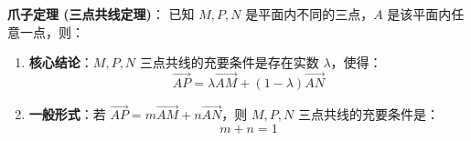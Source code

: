 \begin{statementbox}
\textbf{爪子定理 (三点共线定理)}：
已知 $M, P, N$ 是平面内不同的三点，$A$ 是该平面内任意一点，则：
\begin{enumerate}
    \item \textbf{核心结论}：$M, P, N$ 三点共线的充要条件是存在实数 $\lambda$，使得：
    \[ \vec{AP} = \lambda \vec{AM} + (1 - \lambda) \vec{AN} \]
    \item \textbf{一般形式}：若 $\vec{AP} = m \vec{AM} + n \vec{AN}$，则 $M, P, N$ 三点共线的充要条件是：
    \[ m + n = 1 \]
\end{enumerate}
\end{statementbox}